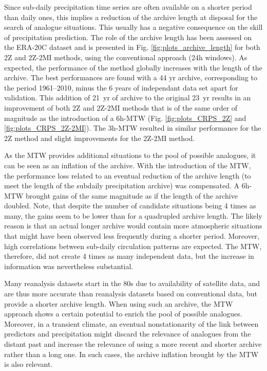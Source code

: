 \documentclass[hess, manuscript]{copernicus}
\begin{document}
	Since sub-daily precipitation time series are often available on a shorter period than daily ones, this implies a reduction of the archive length at disposal for the search of analogue situations. This usually has a negative consequence on the skill of precipitation prediction. The role of the archive length has been assessed on the ERA-20C dataset and is presented in Fig. \ref{fig:plots_archive_length} for both 2Z and 2Z-2MI methods, using the conventional approach (24h windows). As expected, the performance of the method globally increases with the length of the archive. The best performances are found with a 44 yr archive, corresponding to the period 1961--2010, minus the 6 years of independant data set apart for validation. This addition of 21~yr of archive to the original 23~yr results in an improvement of both 2Z and 2Z-2MI methods that is of the same order of magnitude as the introduction of a 6h-MTW (Fig. \ref{fig:plots_CRPS_2Z} and \ref{fig:plots_CRPS_2Z-2MI}). The 3h-MTW resulted in similar performance for the 2Z method and slight improvements for the 2Z-2MI method.
	
	As the MTW provides additional situations to the pool of possible analogues, it can be seen as an inflation of the archive. With the introduction of the MTW, the performance loss related to an eventual reduction of the archive length (to meet the length of the subdaily precipitation archive) was compensated. A 6h-MTW brought gains of the same magnitude as if the length of the archive doubled. Note, that despite the number of candidate situations being 4 times as many, the gains seem to be lower than for a quadrupled archive length. The likely reason is that an actual longer archive would contain more atmospheric situations that might have been observed less frequently during a shorter period. Moreover, high correlations between sub-daily circulation patterns are expected. The MTW, therefore, did not create 4 times as many independent data, but the increase in information was nevertheless substantial.
	
	Many reanalysis datasets start in the 80s due to availability of satellite data, and are thus more accurate than reanalysis datasets based on conventional data, but provide a shorter archive length. When using such an archive, the MTW approach shows a certain potential to enrich the pool of possible analogues. Moreover, in a transient climate, an eventual nonstationarity of the link between predictors and precipitation might discard the relevance of analogues from the distant past and increase the relevance of using a more recent and shorter archive rather than a long one. In such cases, the archive inflation brought by the MTW is also relevant.
	
\end{document}
